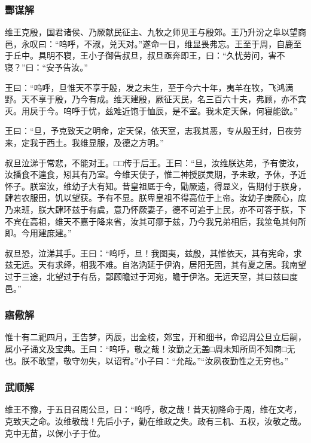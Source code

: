 \documentclass[]{article}
\begin{document}
\hypertarget{header-n167}{%
\subsubsection{酆谋解}\label{header-n167}}

维王克殷，国君诸侯、乃厥献民征主、九牧之师见王与殷郊。王乃升汾之阜以望商邑，永叹曰：``呜呼，不淑，兑天对。''遂命一日，维显畏弗忘。王至于周，自鹿至于丘中。具明不寝，王小子御告叔旦，叔旦亟奔即王，曰：``久忧劳问，害不寝？''曰：``安予告汝。''

王曰：``呜呼，旦惟天不享于殷，发之未生，至于今六十年，夷羊在牧，飞鸿满野。天不享于殷，乃今有成。维天建殷，厥征天民，名三百六十夫，弗顾，亦不宾灭。用戾于今。呜呼于忧，兹难近饱于恤辰，是不室。我未定天保，何寝能欲。''

王曰：``旦，予克致天之明命，定天保，依天室，志我其恶，专从殷王纣，日夜劳来，定我于西土。我维显服，及德之方明。''

叔旦泣涕于常悲，不能对王。□□传于后王。王曰：``旦，汝维朕达弟，予有使汝，汝播食不遑食，矧其有乃室。今维天使子，惟二神授朕灵期，予未致，予休，予近怀子。朕室汝，维幼子大有知。昔皇祖厎于今，勖厥遗，得显义，告期付于朕身，肆若农服田，饥以望获。予有不显。朕卑皇祖不得高位于上帝。汝幼子庚厥心，庶乃来班，朕大肆环兹于有虞，意乃怀厥妻子，德不可追于上民，亦不可答于朕，下不宾在高祖，维天不嘉于降来省，汝其可瘳于兹，乃今我兄弟相后，我筮龟其何所即。今用建庶建。''

叔旦恐，泣涕其手。王曰：``呜呼，旦！我图夷，兹殷，其惟依天，其有宪命，求兹无远。天有求绎，相我不难。自洛汭延于伊汭，居阳无固，其有夏之居。我南望过于三途，北望过于有岳，鄙顾瞻过于河宛，瞻于伊洛。无远天室，其曰兹曰度邑。''

\hypertarget{header-n171}{%
\subsubsection{寤儆解}\label{header-n171}}

惟十有二祀四月，王告梦，丙辰，出金枝，郊宝，开和细书，命诏周公旦立后嗣，属小子诵文及宝典。王曰：``呜呼，敬之哉！汝勤之无盖□周未知所周不知商□无也。朕不敢望，敬守勿失，以诏宥。''小子曰：``允哉。''``汝夙夜勤性之无穷也。''

\hypertarget{header-n175}{%
\subsubsection{武顺解}\label{header-n175}}

维王不豫，于五日召周公旦，曰：``呜呼，敬之哉！昔天初降命于周，维在文考，克致天之命。汝维敬哉！先后小子，勤在维政之失。政有三机、五权，汝敬之哉。克中无苗，以保小子于位。
\end{document}
